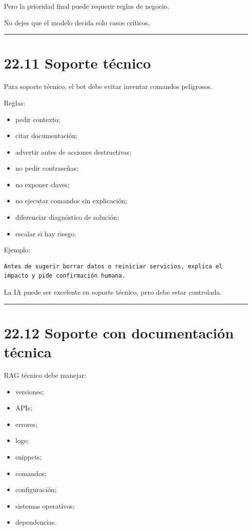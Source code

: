 Pero la prioridad final puede requerir reglas de negocio.

No dejes que el modelo decida solo casos críticos.

\begin{center}\rule{0.5\linewidth}{0.5pt}\end{center}

\section{22.11 Soporte técnico}\label{soporte-tuxe9cnico-1}

Para soporte técnico, el bot debe evitar inventar comandos peligrosos.

Reglas:

\begin{itemize}
\tightlist
\item
  pedir contexto;
\item
  citar documentación;
\item
  advertir antes de acciones destructivas;
\item
  no pedir contraseñas;
\item
  no exponer claves;
\item
  no ejecutar comandos sin explicación;
\item
  diferenciar diagnóstico de solución;
\item
  escalar si hay riesgo.
\end{itemize}

Ejemplo:

\begin{lstlisting}
Antes de sugerir borrar datos o reiniciar servicios, explica el impacto y pide confirmación humana.
\end{lstlisting}

La IA puede ser excelente en soporte técnico, pero debe estar
controlada.

\begin{center}\rule{0.5\linewidth}{0.5pt}\end{center}

\section{22.12 Soporte con documentación
técnica}\label{soporte-con-documentaciuxf3n-tuxe9cnica}

RAG técnico debe manejar:

\begin{itemize}
\tightlist
\item
  versiones;
\item
  APIs;
\item
  errores;
\item
  logs;
\item
  snippets;
\item
  comandos;
\item
  configuración;
\item
  sistemas operativos;
\item
  dependencias.
\end{itemize}

